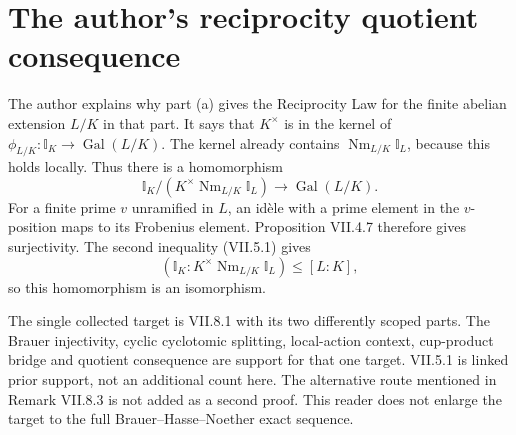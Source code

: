 \documentclass[11pt]{article}
\newcommand{\I}{\mathbb I}
\newcommand{\Nm}{\operatorname{Nm}}
\newcommand{\Gal}{\operatorname{Gal}}
\begin{document}
\section*{The author's reciprocity quotient consequence}
The author explains why part (a) gives the Reciprocity Law for the finite
abelian extension $L/K$ in that part.
It says that $K^\times$ is in the kernel of
$\phi_{L/K}:\I_K\to\Gal(L/K)$. The kernel already contains
$\Nm_{L/K}\I_L$, because this holds locally. Thus there is a homomorphism
\[
 \I_K/(K^\times\Nm_{L/K}\I_L)\longrightarrow\Gal(L/K).
\]
For a finite prime $v$ unramified in $L$, an id\`ele with a prime element
in the $v$-position maps to its Frobenius element. Proposition VII.4.7
therefore gives surjectivity. The second inequality (VII.5.1) gives
\[
 (\I_K:K^\times\Nm_{L/K}\I_L)\le[L:K],
\]
so this homomorphism is an isomorphism.

\medskip
\noindent\small
The single collected target is VII.8.1 with its two differently scoped
parts. The Brauer injectivity, cyclic cyclotomic splitting, local-action
context, cup-product bridge and quotient consequence are support for that
one target. VII.5.1 is linked prior support, not an additional count here.
The alternative route mentioned in Remark VII.8.3 is not added as a second
proof. This reader does not enlarge the target to the full
Brauer--Hasse--Noether exact sequence.
\end{document}
